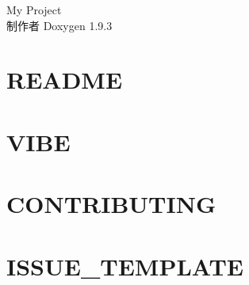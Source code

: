 \documentclass[twoside]{book}
\newcommand{\+}{\discretionary{\mbox{\scriptsize$\hookleftarrow$}}{}{}}
\newcommand{\clearemptydoublepage}{%
    \newpage{\pagestyle{empty}\cleardoublepage}%
  }
\begin{document}
  \raggedbottom
  \begin{CJK}{UTF8}{gbsn}
    \hypersetup{pageanchor=false,
                bookmarksnumbered=true,
                pdfencoding=unicode
               }
  \begin{titlepage}
  \vspace*{7cm}
  \begin{center}%
  {\Large My Project}\\
  \vspace*{1cm}
  {\large 制作者 Doxygen 1.9.3}\\
  \end{center}
  \end{titlepage}
  \clearemptydoublepage
  \tableofcontents
  \clearemptydoublepage
  \hypersetup{pageanchor=true}
\chapter{README}
\label{md__d__zhr_files__multitarget_tracker_master__r_e_a_d_m_e}

\chapter{VIBE}
\label{md__d__zhr_files__multitarget_tracker_master_src__detector_vibe_src__r_e_a_d_m_e}

\chapter{CONTRIBUTING}
\label{md__d__zhr_files__multitarget_tracker_master_thirdparty_pybind11__c_o_n_t_r_i_b_u_t_i_n_g}

\chapter{ISSUE\+\_\+\+TEMPLATE}
\label{md__d__zhr_files__multitarget_tracker_master_thirdparty_pybind11__i_s_s_u_e__t_e_m_p_l_a_t_e}


\end{CJK}
\end{document}
